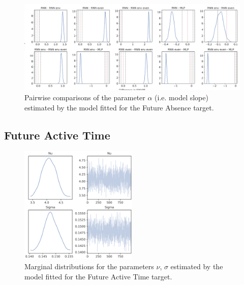 \begin{figure}[H]
\centering
\includegraphics[width=\textwidth]{images/appendix_C/Future_Absence_comp_3.png}
\caption[\textbf{Future absence pairwise comparisons of model fixed effect}]{Pairwise comparisons of the parameter $\alpha$ (i.e. model slope) estimated by the model fitted for the Future Absence target.}
\label{comp_abs_3}
\end{figure}

\subsection{Future Active Time}
\label{future_abs_bayes_3}

\begin{figure}[H]
\centering
\includegraphics[width=0.5\textwidth]{images/appendix_C/Future Active Time_marginals_3.png}
\caption[\textbf{Future active time marginal distributions}]{Marginal distributions for the parameters $\nu$, $\sigma$ estimated by the model fitted for the Future Active Time target.}
\label{marginals_act_3}
\end{figure}

